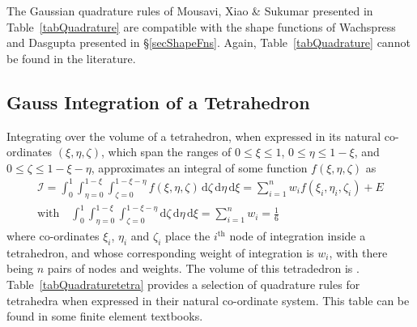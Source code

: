 The Gaussian quadrature rules of Mousavi, Xiao \& Sukumar \cite{Mousavietal10} presented in Table~\ref{tabQuadrature} are compatible with the shape functions of Wachspress \cite{Wachspress75,Wachspress16} and Dasgupta \cite{Dasgupta03} presented in \S\ref{secShapeFns}.  Again, Table~\ref{tabQuadrature} cannot be found in the literature.

\subsection{Gauss Integration of a Tetrahedron}

Integrating over the volume of a tetrahedron, when expressed in its natural co-ordinates $( \xi , \eta , \zeta )$, which span the ranges of $0 \leq \xi \leq 1$, $0 \leq \eta \leq 1 - \xi$, and $0 \leq \zeta \leq 1 - \xi - \eta$, approximates an integral of some function $f ( \xi , \eta , \zeta )$ as
\begin{multline}
     \mathcal{I} = \int_0^1 \int_{\eta=0}^{1-\xi} \int_{\zeta = 0}^{1 - \xi - \eta} 
     f ( \xi , \eta , \zeta ) \, \mathrm{d} \zeta \, \mathrm{d} \eta \, 
     \mathrm{d} \xi = \sum_{i=1}^n w_i f( \xi_i , \eta_i , \zeta_i ) + E \\
     \text{with} \quad 
     \int_0^1 \int_{\eta=0}^{1-\xi} \int_{\zeta = 0}^{1 - \xi - \eta} 
     \mathrm{d} \zeta \, \mathrm{d} \eta \, \mathrm{d} \xi = \sum_{i=1}^n w_i = 
     \frac{1}{6}
\end{multline}
where co-ordinates $\xi_i$, $\eta_i$ and $\zeta_i$ place the $i^{\text{th}}$ node of integration inside a tetrahedron, and whose corresponding weight of integration is $w_i$, with there being $n$ pairs of nodes and weights.  The volume of this tetradedron is .  Table~\ref{tabQuadraturetetra} provides a selection of quadrature rules for tetrahedra when expressed in their natural co-ordinate system.  This table can be found in some finite element textbooks.

